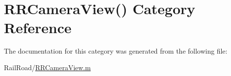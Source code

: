 \hypertarget{category_r_r_camera_view_07_08}{\section{R\-R\-Camera\-View() Category Reference}
\label{category_r_r_camera_view_07_08}
}


The documentation for this category was generated from the following file\-:\begin{DoxyCompactItemize}
\item 
Rail\-Road/\hyperlink{_r_r_camera_view_8m}{R\-R\-Camera\-View.\-m}\end{DoxyCompactItemize}
